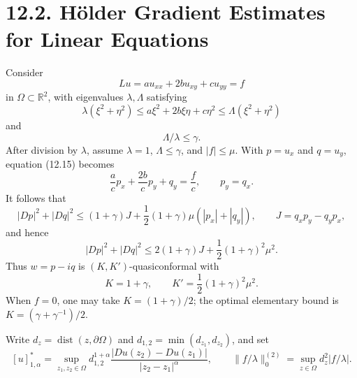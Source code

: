 \section*{12.2. H\"older Gradient Estimates for Linear Equations}

Consider
\begin{equation}\tag{12.15}
Lu=au_{xx}+2bu_{xy}+cu_{yy}=f
\end{equation}
in $\Omega\subset\mathbb R^2$, with eigenvalues $\lambda,\Lambda$ satisfying
\begin{equation}\tag{12.16}
\lambda(\xi^2+\eta^2)
\le a\xi^2+2b\xi\eta+c\eta^2
\le\Lambda(\xi^2+\eta^2)
\end{equation}
and
\begin{equation}\tag{12.17}
\Lambda/\lambda\le\gamma.
\end{equation}
After division by $\lambda$, assume $\lambda=1$, $\Lambda\le\gamma$, and
$|f|\le\mu$.  With $p=u_x$ and $q=u_y$, equation (12.15) becomes
\begin{equation}\tag{12.18}
\frac acp_x+\frac{2b}cp_y+q_y=\frac fc,
\qquad p_y=q_x.
\end{equation}
It follows that
\begin{equation}\tag{12.19}
|Dp|^2+|Dq|^2
\le(1+\gamma)J+\frac12(1+\gamma)\mu(|p_x|+|q_y|),
\qquad
J=q_xp_y-q_yp_x,
\end{equation}
and hence
\begin{equation}\tag{12.20}
|Dp|^2+|Dq|^2
\le2(1+\gamma)J+\frac12(1+\gamma)^2\mu^2.
\end{equation}
Thus $w=p-iq$ is $(K,K')$-quasiconformal with
\begin{equation}\tag{12.21}
K=1+\gamma,
\qquad K'=\frac12(1+\gamma)^2\mu^2.
\end{equation}
When $f=0$, one may take $K=(1+\gamma)/2$; the optimal elementary bound is
$K=(\gamma+\gamma^{-1})/2$.

Write $d_z=\operatorname{dist}(z,\partial\Omega)$ and
$d_{1,2}=\min(d_{z_1},d_{z_2})$, and set
\[
[u]^*_{1,\alpha}
=\sup_{z_1,z_2\in\Omega}
d_{1,2}^{1+\alpha}
\frac{|Du(z_2)-Du(z_1)|}{|z_2-z_1|^\alpha},
\qquad
\|f/\lambda\|_0^{(2)}
=\sup_{z\in\Omega}d_z^2|f/\lambda|.
\]

